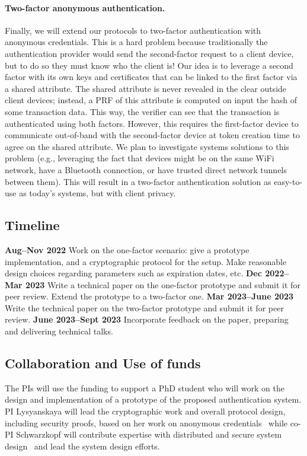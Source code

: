 \documentclass[11pt]{article}
\begin{document}
\paragraph{Two-factor anonymous authentication.} Finally, we will extend our protocols to two-factor authentication with anonymous credentials. This is a hard problem because traditionally the authentication provider would send the second-factor request to a client device, but to do so they must know who the client is! Our idea is to leverage a second factor with its own keys and certificates that can be linked to the first factor via a shared attribute. The shared attribute is never revealed in the clear outside client devices; instead, a PRF of this attribute is computed on input the hash of some transaction data. This way, the verifier can see that the transaction is authenticated using both factors. However, this requires the first-factor device to communicate out-of-band with the second-factor device at token creation time to agree on the shared attribute. We plan to investigate systems solutions to this problem (e.g., leveraging the fact that devices might be on the same WiFi network, have a Bluetooth connection, or have trusted direct network tunnels between them). This will result in a two-factor authentication solution as easy-to-use as today’s systems, but with client privacy.

\subsection*{Timeline}

\noindent \textbf{Aug--Nov 2022} Work on the one-factor scenario: give a prototype implementation, and a cryptographic protocol for the setup.  Make reasonable design choices regarding parameters such as expiration dates, etc.
%
\noindent \textbf{Dec 2022--Mar 2023} Write a technical paper on the one-factor prototype and submit it for peer review.  Extend the prototype to a two-factor one.
%
\noindent \textbf{Mar 2023--June 2023} Write the technical paper on the two-factor prototype and submit it for peer review.
%
\noindent \textbf{June 2023--Sept 2023} Incorporate feedback on the paper, preparing and delivering technical talks.

\subsection*{Collaboration and Use of funds}
%
The PIs will use the funding to support a PhD student who will work on the design and implementation of a prototype of the proposed authentication system.
%
PI Lysyanskaya will lead the cryptographic work and overall protocol design, including security proofs, based on her work on anonymous credentials~\cite{chklm06, CCS:ballys13, EC:camlys01, lr22} while co-PI Schwarzkopf will contribute expertise with distributed and secure system design~\cite{conclave} and lead the system design efforts.
%



\end{document}
